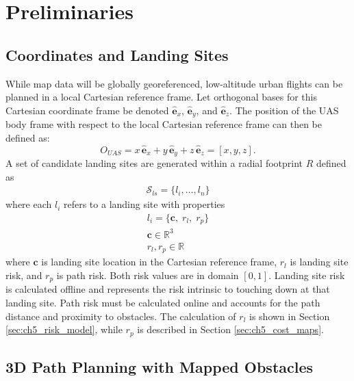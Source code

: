 \section{Preliminaries}\label{sec:ch5_preliminaries}

\subsection{Coordinates and Landing Sites}

While map data will be globally georeferenced, low-altitude urban flights can be planned in a local Cartesian reference frame.
Let orthogonal bases for this Cartesian coordinate frame be denoted $\hat{\mathbf{e}}_x$, $\hat{\mathbf{e}}_y$, and $\hat{\mathbf{e}}_z$. The position of the \ac{UAS} body frame with respect to the local Cartesian reference frame can then be defined as:
\begin{equation}
\label{eq:ch5_position}
    {O}_{UAS}=x\,\hat{\mathbf{e}}_x+y\, \hat{\mathbf{e}}_y+z\, \hat{\mathbf{e}}_z = [x,y,z].
\end{equation}
A set of candidate landing sites are generated within a radial footprint $R$ defined as
\begin{align}
    \mathcal{S}_{ls} = \{ l_i, \ldots, l_n \}
\end{align}
where each $l_i$ refers to a landing site with properties
\begin{align}
    l_i = \{ \mathbf{c},\; r_{l}, \;r_{p} \} \\
    \mathbf{c} \in \mathbb{R}^3 \\
    r_{l}, r_{p} \in \mathbb{R}
\end{align}
where $\mathbf{c}$ is landing site location in the Cartesian reference frame, $r_{l}$ is landing site risk, and $r_{p}$ is path risk. Both risk values are in domain $[0,1]$. Landing site risk is calculated offline and represents the risk intrinsic to touching down at that landing site. Path risk must be calculated online and accounts for the path distance and proximity to obstacles. The calculation of $r_{l}$ is shown in Section \ref{sec:ch5_risk_model}, while $r_{p}$ is described in Section \ref{sec:ch5_cost_maps}.

\subsection{3D Path Planning with Mapped Obstacles}\label{sec:ch5_path_planning}

